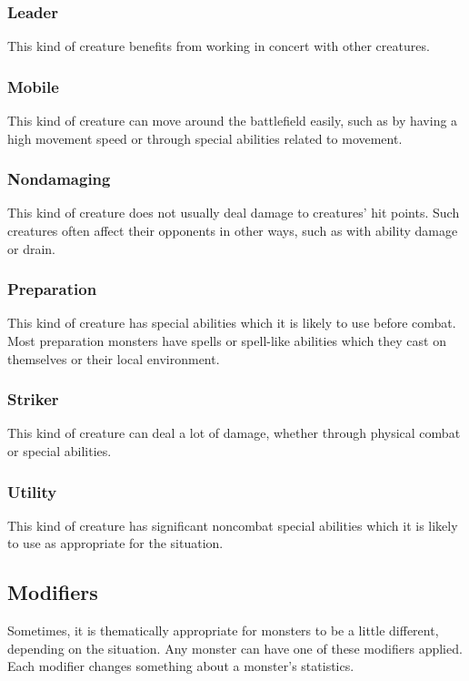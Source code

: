 \subsubsection{Leader}
This kind of creature benefits from working in concert with other creatures.

\subsubsection{Mobile}
This kind of creature can move around the battlefield easily, such as by having a high movement speed or through special abilities related to movement.

\subsubsection{Nondamaging}
This kind of creature does not usually deal damage to creatures' hit points. Such creatures often affect their opponents in other ways, such as with ability damage or drain.

\subsubsection{Preparation}
This kind of creature has special abilities which it is likely to use before combat. Most preparation monsters have spells or spell-like abilities which they cast on themselves or their local environment.

\subsubsection{Striker}
This kind of creature can deal a lot of damage, whether through physical combat or special abilities.

\subsubsection{Utility}
This kind of creature has significant noncombat special abilities which it is likely to use as appropriate for the situation.

\subsection{Modifiers}

Sometimes, it is thematically appropriate for monsters to be a little different, depending on the situation. Any monster can have one of these modifiers applied. Each modifier changes something about a monster's statistics.

